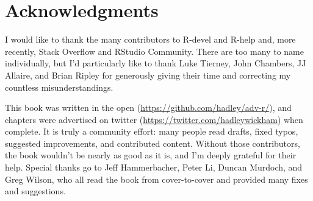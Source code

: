 \documentclass[
]{book}
\renewcommand{\href}[2]{#2 (\url{#1})}
\begin{document}
\hypertarget{intro-ack}{%
\section{Acknowledgments}\label{intro-ack}}

I would like to thank the many contributors to R-devel and R-help and, more recently, Stack Overflow and RStudio Community. There are too many to name individually, but I'd particularly like to thank Luke Tierney, John Chambers, JJ Allaire, and Brian Ripley for generously giving their time and correcting my countless misunderstandings.

This book was \href{https://github.com/hadley/adv-r/}{written in the open}, and chapters were advertised on \href{https://twitter.com/hadleywickham}{twitter} when complete. It is truly a community effort: many people read drafts, fixed typos, suggested improvements, and contributed content. Without those contributors, the book wouldn't be nearly as good as it is, and I'm deeply grateful for their help. Special thanks go to Jeff Hammerbacher, Peter Li, Duncan Murdoch, and Greg Wilson, who all read the book from cover-to-cover and provided many fixes and suggestions.
\end{document}
